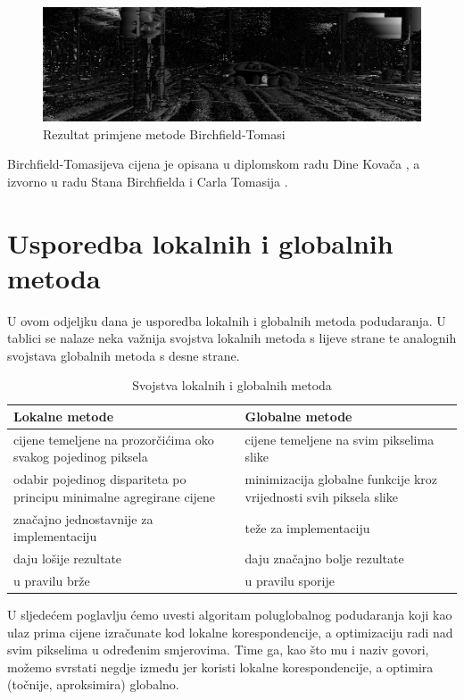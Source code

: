 \documentclass[utf8, zavrsni, numeric]{fer}
\begin{document}
\begin{figure}[htb]
  \centering
  \includegraphics[width=14cm]{img/local_000046_10_BT_1_140_scaled.png}
  \caption{Rezultat primjene metode Birchfield-Tomasi}
  \label{fig:BT-KITTI}
\end{figure}

Birchfield-Tomasijeva cijena je opisana u diplomskom radu Dine Kovača \cite{kovac15ms}, a izvorno u radu Stana Birchfielda i Carla Tomasija \cite{birchfield1998depth}.

\section{Usporedba lokalnih i globalnih metoda}
U ovom odjeljku dana je usporedba lokalnih i globalnih metoda podudaranja.
U tablici se nalaze neka važnija svojstva lokalnih metoda s lijeve strane te
analognih svojstava globalnih metoda s desne strane.

\begin{table}[H]
  \caption{Svojstva lokalnih i globalnih metoda}
  \label{tbl:usp_lok_glob}
  \centering
  \begin{tabularx}{\textwidth}{X|X} \hline
    {\bf Lokalne metode} & {\bf Globalne metode} \\
    \hline
    cijene temeljene na prozorčićima oko svakog pojedinog piksela & cijene temeljene na svim pikselima slike \\
    \hline
    odabir pojedinog dispariteta po principu minimalne agregirane cijene & minimizacija globalne funkcije kroz vrijednosti svih piksela slike \\
    \hline
    značajno jednostavnije za implementaciju & teže za implementaciju \\
    \hline
    daju lošije rezultate & daju značajno bolje rezultate \\
    \hline
    u pravilu brže & u pravilu sporije \\
  \end{tabularx}
\end{table}

U sljedećem poglavlju ćemo uvesti algoritam poluglobalnog podudaranja koji kao ulaz prima cijene izračunate kod lokalne korespondencije, a optimizaciju radi nad svim
pikselima u određenim smjerovima. Time ga, kao što mu i naziv govori, možemo svrstati negdje između jer koristi lokalne korespondencije, a optimira (točnije, aproksimira) globalno.
\end{document}
